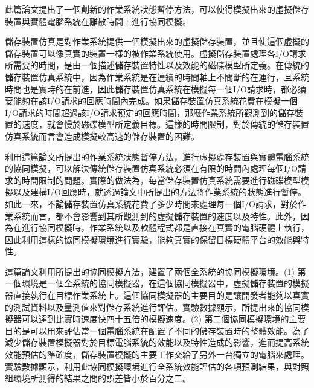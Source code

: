 \begin{abstractCH}

此篇論文提出了一個創新的作業系統狀態暫停方法，可以使得模擬出來的虛擬儲存裝置與實體電腦系統在離散時間上進行協同模擬。

儲存裝置仿真是對作業系統提供一個模擬出來的虛擬儲存裝置，並且使這個虛擬的儲存裝置可以像真實的裝置一樣的被作業系統使用。虛擬儲存裝置處理各I/O請求所需要的時間，是由一個描述儲存裝置特性以及效能的磁碟模型所定義。在傳統的儲存裝置仿真系統中，因為作業系統是在連續的時間軸上不間斷的在運行，且系統時間也是實時的在前進，因此儲存裝置仿真系統在模擬每一個I/O請求時，都必須要能夠在該I/O請求的回應時間內完成。如果儲存裝置仿真系統花費在模擬一個I/O請求的時間超過該I/O請求預定的回應時間，那麼作業系統所觀測到的儲存裝置的速度，就會慢於磁碟模型所定義目標。這樣的時間限制，對於傳統的儲存裝置仿真系統而言會造成模擬較高速的儲存裝置的困難。

利用這篇論文所提出的作業系統狀態暫停方法，進行虛擬處存裝置與實體電腦系統的協同模擬，可以解決傳統儲存裝置仿真系統必須在有限的時間內處理每個I/O請求的時間限制的問題。實際的做法為，每當儲存裝置仿真系統需要進行磁碟模型模擬以及建構I/O回應時，就透過論文中所提出的方法將作業系統的狀態進行暫停。如此一來，不論儲存裝置仿真系統花費了多少時間來處理每一個I/O請求，對於作業系統而言，都不會影響到其所觀測到的虛擬儲存裝置的速度以及特性。此外，因為在進行協同模擬時，作業系統以及軟體程式都是直接在真實的電腦硬體上執行，因此利用這樣的協同模擬環境進行實驗，能夠真實的保留目標硬體平台的效能與特性。

這篇論文利用所提出的協同模擬方法，建置了兩個全系統的協同模擬環境。(1) 第一個環境是一個全系統的協同模擬器，在這個協同模擬器中，虛擬儲存裝置的模擬器直接執行在目標作業系統上。這個協同模擬器的主要目的是讓開發者能夠以真實的測試資料以及量測值來對儲存系統進行評估。實驗數據顯示，所提出來的協同模擬器可以達到比實時速度快四十五倍的模擬速度。(2) 第二個協同模擬環境的主要目的是可以用來評估當一個電腦系統在配置了不同的儲存裝置時的整體效能。為了減少儲存裝置模擬器對於目標電腦系統的效能以及特性造成的影響，進而提高系統效能預估的準確度，儲存裝置模擬的主要工作交給了另外一台獨立的電腦來處理。實驗數據顯示，利用此協同模擬環境進行全系統效能評估的各項預測結果，與對照組環境所測得的結果之間的誤差皆小於百分之二。


\end{abstractCH}